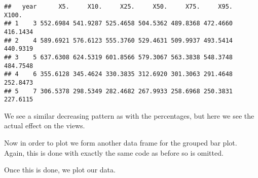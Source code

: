 \documentclass[
]{article}
\newenvironment{Shaded}{\begin{snugshade}}{\end{snugshade}}
\newcommand{\DataTypeTok}[1]{\textcolor[rgb]{0.13,0.29,0.53}{#1}}
\newcommand{\DecValTok}[1]{\textcolor[rgb]{0.00,0.00,0.81}{#1}}
\newcommand{\KeywordTok}[1]{\textcolor[rgb]{0.13,0.29,0.53}{\textbf{#1}}}
\newcommand{\NormalTok}[1]{#1}
\newcommand{\OperatorTok}[1]{\textcolor[rgb]{0.81,0.36,0.00}{\textbf{#1}}}
\newcommand{\StringTok}[1]{\textcolor[rgb]{0.31,0.60,0.02}{#1}}
\begin{document}
\begin{Shaded}
\end{Shaded}

\begin{verbatim}
##   year      X5.     X10.     X25.     X50.     X75.     X95.    X100.
## 1    3 552.6984 541.9287 525.4658 504.5362 489.8368 472.4660 416.1434
## 2    4 589.6921 576.6123 555.3760 529.4631 509.9937 493.5414 440.9319
## 3    5 637.6308 624.5319 601.8566 579.3067 563.3838 548.3748 484.7548
## 4    6 355.6128 345.4624 330.3835 312.6920 301.3063 291.4648 252.8473
## 5    7 306.5378 298.5349 282.4682 267.9933 258.6968 250.3831 227.6115
\end{verbatim}

We see a similar decreasing pattern as with the percentages, but here we
see the actual effect on the views.

Now in order to plot we form another data frame for the grouped bar
plot. Again, this is done with exactly the same code as before so is
omitted.

Once this is done, we plot our data.

\begin{Shaded}
\end{Shaded}
\end{document}
